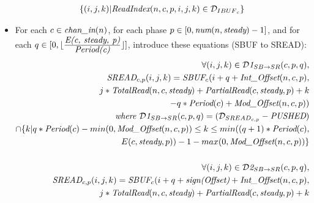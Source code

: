 \begin{itemize}
\begin{align*}
  \{ (i,j,k) | \mbox{\it ReadIndex}(n,c,p,i,j,k) \in {\cal D}_{{IBUF}_{c}} \}
\end{align*}
%
%
\item For each $c \in \mbox{\it chan\_in}(n)$, for each phase $p \in [0,
\mbox{\it num}(n, \mbox{\it steady})-1]$, and for each $q \in [0, \lfloor
\frac{\mbox{\it E(c, steady, p)}}{\mbox{\it Period(c)}} \rfloor]$, introduce
these equations (SBUF to SREAD):
\begin{align*}
\forall (i,j,k) \in {{\cal D}\mt{1}}_{SB {\small \rightarrow} SR}(c,p,q), \\
\mt{SREAD}_{c, p}(i,j,k) = 
    \mt{SBUF}_{c}(i+q+
                  \mt{Int\_Offset}(n,c,p), \\
                  j*\mt{TotalRead}(n,c,\mt{steady}) + 
                    \mt{PartialRead}(c,\mt{steady},p) + k \\
                   - q * \mt{Period}(c) + \mt{Mod\_Offset}(n,c,p)) \\
\mt{where }{{\cal D}\mt{1}}_{SB {\small \rightarrow} SR}(c,p,q) = 
  ({\cal D}_{{SREAD}_{c, p}} - \mt{PUSHED}) \\
                         \cap \{ k | q * \mt{Period}(c) - min(0, \mt{Mod\_Offset}(n,c,p))
                                \le k 
                                \le min((q+1)*\mt{Period}(c),  \\
                                        E(c, \mt{steady}, p)) - 1 
                                        - max(0, \mt{Mod\_Offset}(n,c,p)) \} \\ ~ \\
%
%
\forall (i,j,k) \in {{\cal D}\mt{2}}_{SB {\small \rightarrow} SR}(c,p,q), \\
\mt{SREAD}_{c, p}(i,j,k) = 
    \mt{SBUF}_{c}(i+q+
                  \mt{sign(Offset)} + \mt{Int\_Offset}(n,c,p), \\
                  j*\mt{TotalRead}(n,c,\mt{steady}) + 
                    \mt{PartialRead}(c,\mt{steady},p) + k  \\

\end{align*}
\end{itemize}
